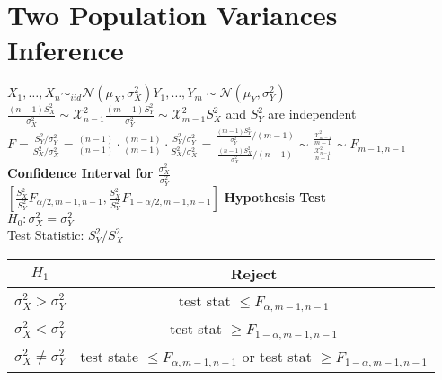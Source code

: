 \documentclass{article}
\begin{document}
\section{Two Population Variances Inference}
\label{sec:twoPVar}
$X_1,\dots,X_n\sim_{iid}\mathcal{N}(\mu_X,\sigma_X^2)$\hspace*{0.5in}$Y_1,\dots,Y_m\sim\mathcal{N}(\mu_Y,\sigma_Y^2)$\\
$\frac{(n-1)S_X^2}{\sigma_X^2}\sim\mathcal{X}^2_{n-1}$\hspace*{0.5in}$\frac{(m-1)S_Y^2}{\sigma_Y^2}\sim\mathcal{X}^2_{m-1}$\hspace*{0.5in}$S_X^2$ and $S_Y^2$ are independent\\
$F=\frac{S_Y^2/\sigma_Y^2}{S_X^2/\sigma_X^2}=\frac{(n-1)}{(n-1)}\cdot\frac{(m-1)}{(m-1)}\cdot\frac{S_Y^2/\sigma_Y^2}{S_X^2/\sigma_X^2}=\frac{\frac{(m-1)S_Y^2}{\sigma_Y^2}/(m-1)}{\frac{(n-1)S_X^2}{\sigma_X^2}/(n-1)}\sim\frac{\frac{\mathcal{X}^2_{m-1}}{m-1}}{\frac{\mathcal{X}^2_{n-1}}{n-1}}\sim F_{m-1,n-1}$\\
\textbf{Confidence Interval for $\frac{\sigma_X^2}{\sigma_Y^2}$}\\
$[\frac{S_X^2}{S_Y^2}F_{\alpha/2,m-1,n-1},\frac{S_X^2}{S_Y^2}F_{1-\alpha/2,m-1,n-1}]$
\newpage
\textbf{Hypothesis Test}\\
$H_0:\sigma_X^2=\sigma_Y^2$\\
Test Statistic: $S_Y^2/S_X^2$\\
\begin{tabular}{c|c}
    $H_1$ & Reject \\
    \hline
     $\sigma_X^2>\sigma_Y^2$ & test stat $\leq F_{\alpha,m-1,n-1}$\\
     \hline
     $\sigma_X^2<\sigma_Y^2$ & test stat $\geq F_{1-\alpha,m-1,n-1}$\\
     \hline
     $\sigma_X^2\neq\sigma_Y^2$ & test state $\leq F_{\alpha,m-1,n-1}$ or test stat $\geq F_{1-\alpha,m-1,n-1}$
\end{tabular}
\end{document}
